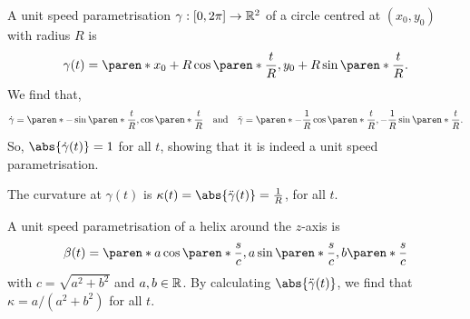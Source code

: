 \documentclass[11pt]{penrose}
\begin{document}
\begin{egg}
    A unit speed parametrisation $\gamma : [0, 2\pi] \to \mathbb{R}^2$ of a circle centred at $(x_0, y_0)$ with radius $R$ is
    \begin{equation}
        \gamma(t) = \paren*{ x_0 + R \cos\paren*{ \frac{t}{R} }, y_0 + R \sin\paren*{ \frac{t}{R} } }.
    \end{equation}
    We find that,
    \begin{equation}
        \dot{\gamma} = \paren*{ -\sin\paren*{ \frac{t}{R} }, \cos\paren*{ \frac{t}{R} } }
        \quad\text{and}\quad
        \ddot{\gamma} = \paren*{ -\frac{1}{R} \cos\paren*{ \frac{t}{R} }, -\frac{1}{R} \sin\paren*{ \frac{t}{R} } }.
    \end{equation}
    So, $\abs{\dot{\gamma}(t)} = 1$ for all $t$, showing that it is indeed a unit speed parametrisation.

    The curvature at $\gamma(t)$ is $\kappa(t) = \abs{\ddot{\gamma}(t)} = \frac{1}{R}$, for all $t$.
\end{egg}

\begin{egg}
    A unit speed parametrisation of a helix around the $z$-axis is
    \begin{equation}
        \beta(t) = \paren*{ a \cos\paren*{\frac{s}{c}}, a \sin\paren*{\frac{s}{c}}, b\paren*{\frac{s}{c}} }
    \end{equation}
    with $c = \sqrt{a^2 + b^2}$ and $a, b \in \mathbb{R}$. By calculating $\abs{\ddot{\gamma}(t)}$, we find that $\kappa = a / (a^2 + b^2)$ for all $t$.
\end{egg}
\end{document}
